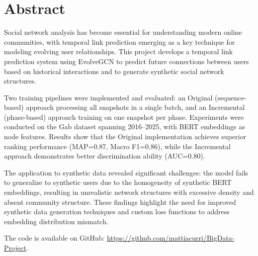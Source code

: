 \documentclass[11pt,oneside]{book}
\begin{document}



\chapter*{Abstract}

Social network analysis has become essential for understanding modern online communities, with temporal link prediction emerging as a key technique for modeling evolving user relationships. This project develops a temporal link prediction system using EvolveGCN to predict future connections between users based on historical interactions and to generate synthetic social network structures.

Two training pipelines were implemented and evaluated: an Original (sequence-based) approach processing all snapshots in a single batch, and an Incremental (phase-based) approach training on one snapshot per phase. Experiments were conducted on the Gab dataset spanning 2016--2025, with BERT embeddings as node features. Results show that the Original implementation achieves superior ranking performance (MAP=0.87, Macro F1=0.86), while the Incremental approach demonstrates better discrimination ability (AUC=0.80).

The application to synthetic data revealed significant challenges: the model fails to generalize to synthetic users due to the homogeneity of synthetic BERT embeddings, resulting in unrealistic network structures with excessive density and absent community structure. These findings highlight the need for improved synthetic data generation techniques and custom loss functions to address embedding distribution mismatch.

The code is available on GitHub: \url{https://github.com/mattiacurri/BigData-Project}.

\restoregeometry
\pagestyle{empty}
{
	\tableofcontents
}
\mainmatter








\pagestyle{fancy}


\end{document}
